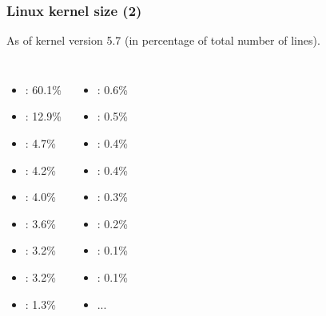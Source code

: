 \begin{frame}
  \frametitle{Linux kernel size (2)}
  As of kernel version 5.7 (in percentage of total number of lines).
  \begin{columns}
    \begin{itemize}
       \item {}: 60.1\%
       \item {}: 12.9\%
       \item {}: 4.7\%
       \item {}: 4.2\%
       \item {}: 4.0\%
       \item {}: 3.6\%
       \item {}: 3.2\%
       \item {}: 3.2\%
       \item {}: 1.3\%
    \end{itemize}
    \begin{itemize}
       \item {}: 0.6\%
       \item {}: 0.5\%
       \item {}: 0.4\%
       \item {}: 0.4\%
       \item {}: 0.3\%
       \item {}: 0.2\%
       \item {}: 0.1\%
       \item {}: 0.1\%
       \item ...
    \end{itemize}
  \end{columns}
\end{frame}
